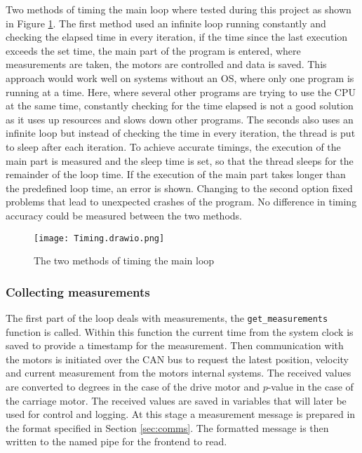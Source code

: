 \documentclass[12pt]{article}
\begin{document}
Two methods of timing the main loop where tested during this project as shown in Figure \ref{fig:timings}. The first method used an infinite loop running constantly and checking the elapsed time in every iteration, if the time since the last execution exceeds the set time, the main part of the program is entered, where measurements are taken, the motors are controlled and data is saved. This approach would work well on systems without an OS, where only one program is running at a time. Here, where several other programs are trying to use the CPU at the same time, constantly checking for the time elapsed is not a good solution as it uses up resources and slows down other programs.
The seconds also uses an infinite loop but instead of checking the time in every iteration, the thread is put to sleep after each iteration. To achieve accurate timings, the execution of the main part is measured and the sleep time is set, so that the thread sleeps for the remainder of the loop time. If the execution of the main part takes longer than the predefined loop time, an error is shown.
Changing to the second option fixed problems that lead to unexpected crashes of the program. No difference in timing accuracy could be measured between the two methods.

\begin{figure}[h]
    \centering
    \texttt{[image: Timing.drawio.png]}
    \caption{The two methods of timing the main loop}
    \label{fig:timings}
\end{figure}



\subsubsection{Collecting measurements}
The first part of the loop deals with measurements, the \verb|get_measurements| function is called. Within this function the current time from the system clock is saved to provide a timestamp for the measurement. Then communication with the motors is initiated over the CAN bus to request the latest position, velocity and current measurement from the motors internal systems. The received values are converted to degrees in the case of the drive motor and $p$-value in the case of the carriage motor. The received values are saved in variables that will later be used for control and logging. At this stage a measurement message is prepared in the format specified in Section \ref{sec:comms}. The formatted message is then written to the named pipe for the frontend to read.
\end{document}
